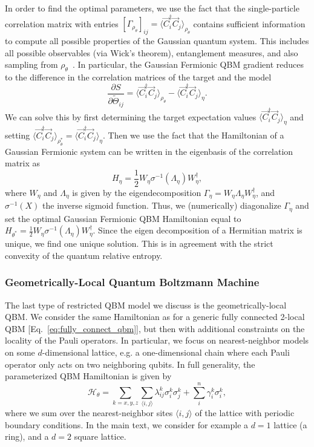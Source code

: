 \documentclass[
    aps,
    prx,
    onecolumn
]{revtex4-2}
\begin{document}
In order to find the optimal parameters, we use the fact that the single-particle correlation matrix with entries $ [\Gamma_{\rho_\theta}]_{ij} = \langle \vec{C}^\dagger_i \vec{C}_j \rangle_{\rho_\theta}$ contains sufficient information to compute all possible properties of the Gaussian quantum system. This includes all possible observables (via Wick's theorem), entanglement measures, and also sampling from $\rho_\theta$~\cite{Surace_2022}. In particular, the Gaussian Fermionic QBM gradient reduces to the difference in the correlation matrices of the target and the model
\begin{equation}
\frac{\partial S}{\partial \tilde{\Theta}_{ij}} = \langle \vec{C}^\dagger_i \vec{C}_j \rangle_{\rho_\theta} - \langle \vec{C}^\dagger_i \vec{C}_j \rangle_{\eta}.
\end{equation} 
We can solve this by first determining the target expectation values $\langle \vec{C}^\dagger_i \vec{C}_j \rangle_{\eta}$ and setting $\langle \vec{C}^\dagger_i \vec{C}_j \rangle_{\rho_\theta^*} = \langle \vec{C}^\dagger_i \vec{C}_j \rangle_{\eta}$. Then we use the fact that the Hamiltonian of a Gaussian Fermionic system can be written in the eigenbasis of the correlation matrix as 
\begin{equation}
     H_\eta =  \frac{1}{2} W_\eta \sigma^{-1}(\Lambda_\eta) W^\dagger_\eta,
\end{equation} 
where $W_\eta$ and $\Lambda_\eta$ is given by the eigendecomposition $\Gamma_{\eta} = W_\eta \Lambda_\eta W_\eta^\dagger$, and $\sigma^{-1}(X)$ the inverse sigmoid function. Thus, we (numerically) diagonalize $\Gamma_{\eta}$ and set the optimal Gaussian Fermionic QBM Hamiltonian equal to $H_{\theta^*}= \frac{1}{2}W_\eta \sigma^{-1}(\Lambda_\eta) W^\dagger_\eta$. Since the eigen decomposition of a Hermitian matrix is unique, we find one unique solution. This is in agreement with the strict convexity of the quantum relative entropy.

\subsubsection{Geometrically-Local Quantum Boltzmann Machine}

The last type of restricted QBM model we discuss is the geometrically-local QBM. 
We consider the same Hamiltonian as for a generic fully connected 2-local QBM [Eq.~\eqref{eq:fully_connect_qbm}], but then with additional constraints on the locality of the Pauli operators. In particular, we focus on nearest-neighbor models on some $d$-dimensional lattice, e.g. a one-dimensional chain where each Pauli operator only acts on two neighboring qubits. In full generality, the parameterized QBM Hamiltonian is given by \begin{equation} 
\label{eq:nnmodel}
    \mathcal{H}_\theta = \sum_{k=x,y,z}\sum_{\langle i, j\rangle}\lambda^k_{ij}\sigma_i^k\sigma^k_j + \sum_i^n \gamma^k_i\sigma^k_i,
\end{equation} 
where we sum over the nearest-neighbor sites $\langle i,j \rangle$ of the lattice with periodic boundary conditions. In the main text, we consider for example a $d=1$ lattice (a ring), and a $d=2$ square lattice.
\end{document}
